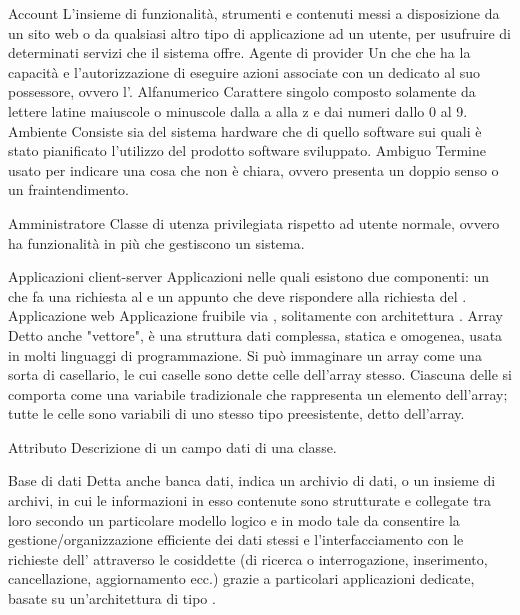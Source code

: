 \Inizio{}
\elemento
{Account} 
{L'insieme di funzionalità, strumenti e contenuti messi a disposizione da un sito web o da qualsiasi altro tipo di applicazione ad un utente, per usufruire di determinati servizi che il sistema offre.}
\elemento
{Agente di provider} 
{Un  che che ha la capacità e l'autorizzazione di eseguire azioni associate con un  dedicato al suo possessore, ovvero l'.}
\elemento
{Alfanumerico}
{Carattere singolo composto solamente da lettere latine maiuscole o minuscole dalla a alla z e dai numeri dallo 0 al 9.}
\elemento
{Ambiente}
{Consiste sia del sistema hardware che di quello software sui quali è stato pianificato l'utilizzo del prodotto software sviluppato.}
\elemento
{Ambiguo}
{Termine usato per indicare una cosa che non è chiara, ovvero presenta un doppio senso o un fraintendimento.}

\elemento
{Amministratore} 
{Classe di utenza privilegiata rispetto ad utente normale, ovvero ha funzionalità in più che gestiscono un sistema.}

\elemento
{Applicazioni client-server}
{Applicazioni nelle quali esistono due componenti: un  che fa una richiesta al  e un  appunto che deve rispondere alla richiesta del .}
\elemento
{Applicazione web} 
{Applicazione fruibile via , solitamente con architettura .}
\elemento
{Array} 
{Detto anche "vettore", è una struttura dati complessa, statica e omogenea, usata in molti linguaggi di programmazione. Si può immaginare un array come una sorta di casellario, le cui caselle sono dette celle dell'array stesso. Ciascuna delle  si comporta come una variabile tradizionale che rappresenta un elemento dell'array; tutte le celle sono variabili di uno stesso tipo preesistente, detto  dell'array.}

\elemento
{Attributo}
{Descrizione di un campo dati di una classe.}

\elemento
{Base di dati} 
{Detta anche banca dati, indica un archivio di dati, o un insieme di archivi, in cui le informazioni in esso contenute sono strutturate e collegate tra loro secondo un particolare modello logico e in modo tale da consentire la gestione/organizzazione efficiente dei dati stessi e l'interfacciamento con le richieste dell' attraverso le cosiddette  (di ricerca o interrogazione, inserimento, cancellazione, aggiornamento ecc.) grazie a particolari applicazioni  dedicate, basate su un'architettura di tipo .}

